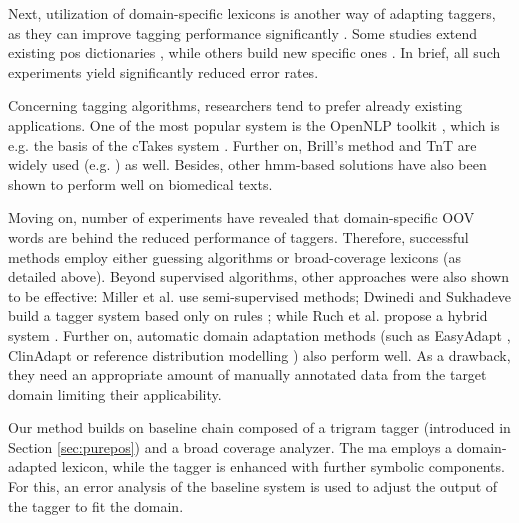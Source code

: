 Next, utilization of domain-specific lexicons is another way of adapting taggers, as they can improve tagging performance significantly \cite{coden2005domain,ruch2000minimal}. 
Some studies extend existing \acrshort{pos} dictionaries \cite{divita2006dtagger}, while others build new specific ones \cite{Smith2006}. 
In brief, all such experiments yield significantly reduced error rates. 

Concerning tagging algorithms, researchers tend to prefer already existing applications. 
One of the most popular system is the OpenNLP toolkit \cite{Baldridge2002}, which is e.g. the basis of the cTakes system \cite{Savova2010}.
Further on, Brill’s method \cite{Brill1992} and TnT \cite{Brants2000} are widely used (e.g. \cite{hahn2004tagging,Savova2010,pestian2004development}) as well. 
Besides, other \acrshort{hmm}-based solutions have also been shown to perform well \cite{barrett2011token,coden2005domain,divita2006dtagger,hahn2004tagging,pakhomov2006developing,rost2008lessons,ruch2000minimal} on biomedical texts. 

Moving on, number of experiments have revealed \cite{ferraro2013improving,ruch2000minimal,Smith2006} that domain-specific OOV words are behind the reduced performance of taggers. 
Therefore, successful methods employ either guessing algorithms \cite{barrett2011token,divita2006dtagger,rost2008lessons,ruch2000minimal,Smith2006} or broad-coverage lexicons (as detailed above). 
Beyond supervised algorithms, other approaches were also shown to be effective: Miller et al. \cite{miller2007building} use semi-supervised methods;
Dwinedi and Sukhadeve build a tagger system based only on rules \cite{dwivedi8rule}; while Ruch et al. propose a hybrid system \cite{ruch2000minimal}. 
Further on, automatic domain adaptation methods (such as EasyAdapt \cite{daume2007frustratingly}, ClinAdapt \cite{ferraro2013improving} 
or reference distribution modelling  \cite{tateisi2006subdomain}) also perform well. As a drawback, they need an appropriate amount of manually annotated data from the target domain limiting their applicability. 

Our method builds on  baseline chain composed of a trigram tagger (introduced in Section \ref{sec:purepos}) and a broad coverage analyzer. 
The \acrshort{ma} employs a domain-adapted lexicon, while the tagger is enhanced with further symbolic components.
For this, an error analysis of the baseline system is used to adjust the output of the tagger to fit the domain.

